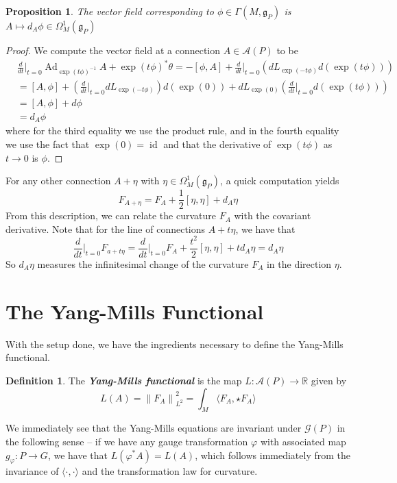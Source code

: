 \documentclass[psamsfonts, 12pt]{amsart}
\newtheorem{prop}[thm]{Proposition}
\theoremstyle{definition}
\newtheorem{defn}[thm]{Definition}
\theoremstyle{remark}
\newcommand{\R}{\mathbb{R}}
\newcommand{\ib}[1]{\textbf{\textit{#1}}}
\newcommand{\g}{\mathfrak{g}}
\newcommand{\inv}{^{-1}}
\newcommand{\norm}[1]{\left\lVert#1\right\rVert}
\DeclareMathOperator{\id}{id}
\DeclareMathOperator{\Ad}{Ad}
\begin{document}
%
\begin{prop}
The vector field corresponding to $\phi \in \Gamma(M,\g_P)$ is
$A \mapsto d_A\phi \in \Omega_M^1(\g_P)$
\end{prop}
%
\begin{proof}
We compute the vector field at a connection $A \in \mathscr{A}(P)$ to be
\begin{align*}
&\frac{d}{dt}\bigg\vert_{t=0} \Ad_{\exp(t\phi)\inv} A + \exp(t\phi)^*\theta
= -[\phi, A] + \frac{d}{dt}\bigg\vert_{t=0}(dL_{\exp(-t\phi)} d(\exp(t\phi))) \\
&= [A,\phi] + \left(\frac{d}{dt}\bigg\vert_{t=0} dL_{\exp(-t\phi)}\right)d(\exp(0))
+ dL_{\exp(0)}\left(\frac{d}{dt}\bigg\vert_{t=0}d(\exp(t\phi))\right) \\[5pt]
&= [A,\phi] + d\phi\\
&= d_A\phi
\end{align*}
where for the third equality we use the product rule, and in the fourth equality
we use the fact that $\exp(0) = \id$ and that the derivative of
$\exp(t\phi)$ as $t \to 0$ is $\phi$.
\end{proof}
%
For any other connection $A + \eta$ with $\eta \in \Omega^1_M(\g_P)$,
a quick computation yields
\[
F_{A+\eta} = F_A + \frac{1}{2}[\eta,\eta] + d_A\eta
\]
From this description, we can relate the curvature $F_A$ with the covariant derivative.
Note that for the line of connections $A + t\eta$, we have that
\[
\frac{d}{dt}\bigg\vert_{t=0} F_{a+t\eta} =
\frac{d}{dt}\bigg\vert_{t=0} F_A + \frac{t^2}{2}[\eta,\eta] + td_A\eta
= d_A\eta
\]
So $d_A\eta$ measures the infinitesimal change of the curvature $F_A$ in the direction
$\eta$.
%
\section{The Yang-Mills Functional}
%
With the setup done, we have the ingredients necessary to define the Yang-Mills
functional.
%
\begin{defn}
The \ib{Yang-Mills functional} is the map
$L : \mathscr{A}(P) \to \R$ given by
\[
L(A) = \norm{F_A}_{L^2}^2 = \int_M \langle F_A,\star F_A \rangle
\]
\end{defn}
%
We immediately see that the Yang-Mills equations are invariant under $\mathscr{G}(P)$
in the following sense -- if we have any gauge transformation $\varphi$ with
associated map $g_\varphi : P \to G$, we have that $L(\varphi^*A) = L(A)$,
which follows immediately from the invariance of $\langle\cdot,\cdot\rangle$
and the transformation law for curvature. \\
\end{document}
